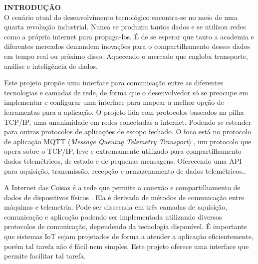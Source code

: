 \noindent\textbf{INTRODUÇÃO}
$\!$\\

O cenário atual do desenvolvimento tecnológico encontra-se no meio de uma quarta revolução industrial. Nunca se produziu tantos dados e se utilizou redes como a própria internet para propaga-los. É de se esperar que tanto a academia e diferentes mercados demandem inovações para o compartilhamento desses dados em tempo real ou próximo disso. Aquecendo o mercado que engloba transporte, análise e inteligência de dados.

Este projeto propõe uma interface para comunicação entre as diferentes tecnologias e camadas de rede, de forma que o desenvolvedor só se preocupe em  implementar e configurar uma interface para mapear a melhor opção de ferramentas para a aplicação. O projeto lida com protocolos baseados na pilha TCP/IP, uma unanimidade em redes conectadas a internet. Podendo se estender para outras protocolos de aplicações de escopo fechado. O foco está no protocolo de aplicação MQTT (\textit{Message Queuing Telemetry Transport}) \cite{mqtt}, um protocolo que opera sobre o TCP/IP, leve e extremamente utilizado para compartilhamento dados telemétricos, de estado e de pequenas mensagens. Oferecendo uma API para aquisição, transmissão, recepção e armazenamento de dados telemétricos..

A Internet das Coisas é a rede que permite a conexão e compartilhamento de dados  de dispositivos físicos . Ela é derivada de métodos de comunicação entre máquinas e telemetria. Pode ser dissecada em três camadas de aquisição, comunicação e aplicação  podendo ser implementada utilizando diversos protocolos de comunicação, dependendo da tecnologia disponível. É importante que sistemas IoT sejam projetados de forma a atender a aplicação eficientemente, porém tal tarefa não é fácil nem simples. Este projeto oferece uma interface que permite facilitar tal tarefa.


 